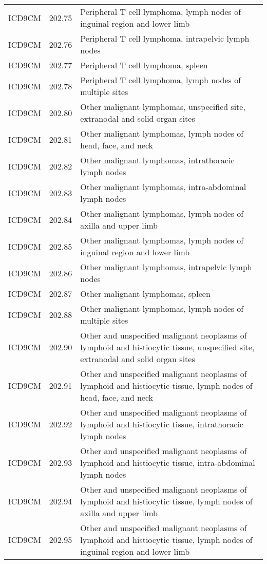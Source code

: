 \begin{longtable}{p{}p{}p{}}
  ICD9CM & 202.75 & Peripheral T cell lymphoma, lymph nodes of inguinal region and lower limb \\ 
  ICD9CM & 202.76 & Peripheral T cell lymphoma, intrapelvic lymph nodes \\ 
  ICD9CM & 202.77 & Peripheral T cell lymphoma, spleen \\ 
  ICD9CM & 202.78 & Peripheral T cell lymphoma, lymph nodes of multiple sites \\ 
  ICD9CM & 202.80 & Other malignant lymphomas, unspecified site, extranodal and solid organ sites \\ 
  ICD9CM & 202.81 & Other malignant lymphomas, lymph nodes of head, face, and neck \\ 
  ICD9CM & 202.82 & Other malignant lymphomas, intrathoracic lymph nodes \\ 
  ICD9CM & 202.83 & Other malignant lymphomas, intra-abdominal lymph nodes \\ 
  ICD9CM & 202.84 & Other malignant lymphomas, lymph nodes of axilla and upper limb \\ 
  ICD9CM & 202.85 & Other malignant lymphomas, lymph nodes of inguinal region and lower limb \\ 
  ICD9CM & 202.86 & Other malignant lymphomas, intrapelvic lymph nodes \\ 
  ICD9CM & 202.87 & Other malignant lymphomas, spleen \\ 
  ICD9CM & 202.88 & Other malignant lymphomas, lymph nodes of multiple sites \\ 
  ICD9CM & 202.90 & Other and unspecified malignant neoplasms of lymphoid and histiocytic tissue, unspecified site, extranodal and solid organ sites \\ 
  ICD9CM & 202.91 & Other and unspecified malignant neoplasms of lymphoid and histiocytic tissue, lymph nodes of head, face, and neck \\ 
  ICD9CM & 202.92 & Other and unspecified malignant neoplasms of lymphoid and histiocytic tissue, intrathoracic lymph nodes \\ 
  ICD9CM & 202.93 & Other and unspecified malignant neoplasms of lymphoid and histiocytic tissue, intra-abdominal lymph nodes \\ 
  ICD9CM & 202.94 & Other and unspecified malignant neoplasms of lymphoid and histiocytic tissue, lymph nodes of axilla and upper limb \\ 
  ICD9CM & 202.95 & Other and unspecified malignant neoplasms of lymphoid and histiocytic tissue, lymph nodes of inguinal region and lower limb \\ 

\end{longtable}
